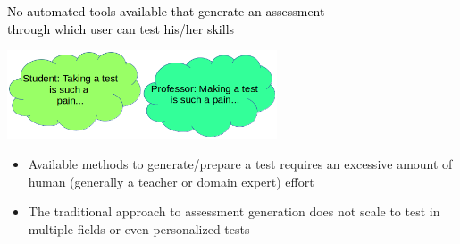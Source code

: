 \documentclass[sansserif,mathserif]{beamer}
\renewcommand{\subtitle}[1]{\vspace{6mm}{\large \bf \color{subtitlecolor} #1}}
\begin{document}
\begin{frame}
\frametitle{
\color{white}{\Huge \bf Automatic Assessment Generation via Machine Learning\\[0.3cm]}
\color{white}{\Large Arjun Jauhari (Advised by Igor Labutov and Christoph Studer) }
}

\vspace{4.0cm}


\vspace{-0.2cm}

\begin{columns}

\begin{column}{0.309\textwidth}

\vspace{-1.5cm}
\subtitle{The Problem}
\vspace{0.1cm}

\begin{exampleblock}{\vspace{-.4cm}\begin{center}\textcolor{black}{No automated tools available that generate an assessment \\ through which user can test his/her skills}\end{center}\vspace{-.2cm}}
\vspace{-0.2cm}
\end{exampleblock}

\vspace{-0.3cm}
\begin{center}
\includegraphics[width=0.6\textwidth]{fun2.png} 
\vspace{-0.7cm}
\end{center}


\begin{itemize}
    \item Available methods to generate/prepare a test requires an excessive amount of human (generally a teacher or domain expert) effort 
    \item The traditional approach to assessment generation does not scale to test in multiple fields or even personalized tests
\\[0.1cm]
\end{itemize}



\end{column}
\end{columns}
\end{frame}
\end{document}
